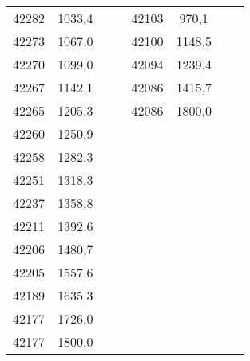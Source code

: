 \documentclass[11pt]{article}
\begin{document}
{{\begin{tabular}{|c|c|c|c|c|c|c|c|}
            42282 & 1033,4 &  &  & 42103 & 970,1 &  & \tabularnewline
            \cline{1-2} \cline{5-6} 
            42273 & 1067,0 &  &  & 42100 & 1148,5 &  & \tabularnewline
            \cline{1-2} \cline{5-6} 
            42270 & 1099,0 &  &  & 42094 & 1239,4 &  & \tabularnewline
            \cline{1-2} \cline{5-6} 
            42267 & 1142,1 &  &  & 42086 & 1415,7 &  & \tabularnewline
            \cline{1-2} \cline{5-6} 
            42265 & 1205,3 &  &  & 42086 & 1800,0 &  & \tabularnewline
            \cline{1-2} \cline{5-6} 
            42260 & 1250,9 &  & \multicolumn{1}{c}{} & \multicolumn{1}{c}{} & \multicolumn{1}{c}{} &  & \tabularnewline
            \cline{1-2} 
            42258 & 1282,3 &  & \multicolumn{1}{c}{} & \multicolumn{1}{c}{} & \multicolumn{1}{c}{} &  & \tabularnewline
            \cline{1-2} 
            42251 & 1318,3 &  & \multicolumn{1}{c}{} & \multicolumn{1}{c}{} & \multicolumn{1}{c}{} &  & \tabularnewline
            \cline{1-2} 
            42237 & 1358,8 &  & \multicolumn{1}{c}{} & \multicolumn{1}{c}{} & \multicolumn{1}{c}{} &  & \tabularnewline
            \cline{1-2} 
            42211 & 1392,6 &  & \multicolumn{1}{c}{} & \multicolumn{1}{c}{} & \multicolumn{1}{c}{} &  & \tabularnewline
            \cline{1-2} 
            42206 & 1480,7 &  & \multicolumn{1}{c}{} & \multicolumn{1}{c}{} & \multicolumn{1}{c}{} &  & \tabularnewline
            \cline{1-2} 
            42205 & 1557,6 &  & \multicolumn{1}{c}{} & \multicolumn{1}{c}{} & \multicolumn{1}{c}{} &  & \tabularnewline
            \cline{1-2} 
            42189 & 1635,3 &  & \multicolumn{1}{c}{} & \multicolumn{1}{c}{} & \multicolumn{1}{c}{} &  & \tabularnewline
            \cline{1-2} 
            42177 & 1726,0 &  & \multicolumn{1}{c}{} & \multicolumn{1}{c}{} & \multicolumn{1}{c}{} &  & \tabularnewline
            \cline{1-2} 
            42177 & 1800,0 &  & \multicolumn{1}{c}{} & \multicolumn{1}{c}{} & \multicolumn{1}{c}{} &  & \tabularnewline
            \cline{1-2} 
        \end{tabular}
    }
}
\vspace*{\fill}
\end{document}
